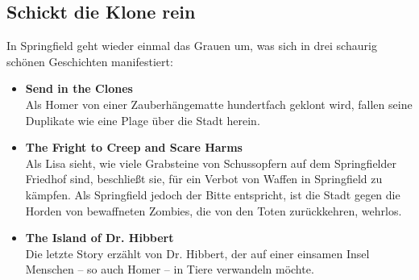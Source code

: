
\subsection{Schickt die Klone rein}\label{DABF19}
In Springfield geht wieder einmal das Grauen um, was sich in drei schaurig schönen Geschichten manifestiert:
\begin{itemize}
	\item \textbf{Send in the Clones}\\ Als Homer von einer Zauberhängematte hundertfach geklont wird, fallen seine Duplikate wie eine Plage über die Stadt herein.
	\item \textbf{The Fright to Creep and Scare Harms}\\ Als Lisa sieht, wie viele Grabsteine von Schussopfern auf dem Springfielder Friedhof sind, beschließt sie, für ein Verbot von Waffen in Springfield zu kämpfen. Als Springfield jedoch der Bitte entspricht, ist die Stadt gegen die Horden von bewaffneten Zombies, die von den Toten zurückkehren, wehrlos.
	\item \textbf{The Island of Dr. Hibbert}\\ Die letzte Story erzählt von Dr. Hibbert, der auf einer einsamen Insel Menschen -- so auch Homer -- in Tiere verwandeln möchte.
\end{itemize}

